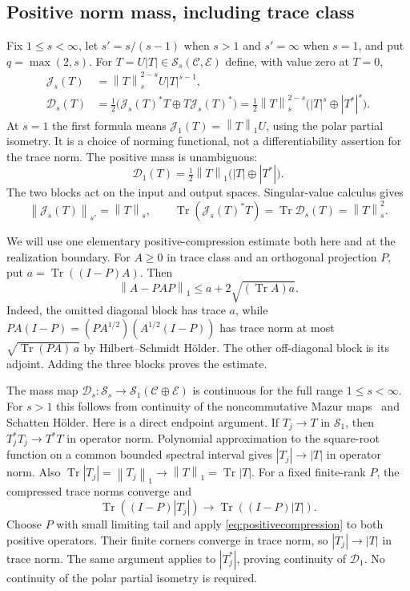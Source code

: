 \documentclass[11pt,a4paper]{amsart}
\numberwithin{equation}{section}
\theoremstyle{definition}
\theoremstyle{remark}
\newcommand{\cC}{\mathcal C}
\newcommand{\cE}{\mathcal E}
\newcommand{\Sch}{\mathcal S}
\DeclareMathOperator{\Tr}{Tr}
\newcommand{\norm}[1]{\left\lVert#1\right\rVert}
\newcommand{\Dens}{\mathscr D_s}
\newcommand{\Jdu}{\mathscr J_s}
\begin{document}
\subsection{Positive norm mass, including trace class}
Fix $1\le s<\infty$, let $s'=s/(s-1)$ when $s>1$ and $s'=\infty$ when $s=1$, and put $q=\max(2,s)$. For $T=U|T|\in\Sch_s(\cC,\cE)$ define, with value zero at $T=0$,
\begin{align}
 \Jdu(T)&=\norm T_s^{2-s}U|T|^{s-1},\label{eq:dualitymap}\\
 \Dens(T)&=\tfrac12\big(\Jdu(T)^*T\oplus T\Jdu(T)^*\big)
 =\tfrac12\norm T_s^{2-s}\big(|T|^s\oplus|T^*|^s\big).\label{eq:positivemass}
\end{align}
At $s=1$ the first formula means $\mathscr J_1(T)=\norm T_1U$, using the polar partial isometry. It is a choice of norming functional, not a differentiability assertion for the trace norm. The positive mass is unambiguous:
\[
 \mathscr D_1(T)=\tfrac12\norm T_1\big(|T|\oplus|T^*|\big).
\]
The two blocks act on the input and output spaces. Singular-value calculus gives
\begin{equation}\label{eq:massidentity}
 \norm{\Jdu(T)}_{s'}=\norm T_s,
 \qquad\Tr(\Jdu(T)^*T)=\Tr\Dens(T)=\norm T_s^2.
\end{equation}

We will use one elementary positive-compression estimate both here and at the realization boundary. For $A\ge0$ in trace class and an orthogonal projection $P$, put $a=\Tr((I-P)A)$. Then
\begin{equation}\label{eq:positivecompression}
 \norm{A-PAP}_1\le a+2\sqrt{(\Tr A)a}.
\end{equation}
Indeed, the omitted diagonal block has trace $a$, while
$PA(I-P)=(PA^{1/2})(A^{1/2}(I-P))$ has trace norm at most
$\sqrt{\Tr(PA)\,a}$ by Hilbert--Schmidt H\"older. The other off-diagonal block is its adjoint. Adding the three blocks proves the estimate.

The mass map $\Dens:\Sch_s\to\Sch_1(\cC\oplus\cE)$ is continuous for the full range $1\le s<\infty$. For $s>1$ this follows from continuity of the noncommutative Mazur maps~\cite{Ricard} and Schatten H\"older. Here is a direct endpoint argument. If $T_j\to T$ in $\Sch_1$, then $T_j^*T_j\to T^*T$ in operator norm. Polynomial approximation to the square-root function on a common bounded spectral interval gives $|T_j|\to|T|$ in operator norm. Also
$\Tr|T_j|=\norm{T_j}_1\to\norm T_1=\Tr|T|$.
For a fixed finite-rank $P$, the compressed trace norms converge and
\[
 \Tr((I-P)|T_j|)\longrightarrow\Tr((I-P)|T|).
\]
Choose $P$ with small limiting tail and apply \eqref{eq:positivecompression} to both positive operators. Their finite corners converge in trace norm, so $|T_j|\to|T|$ in trace norm. The same argument applies to $|T_j^*|$, proving continuity of $\mathscr D_1$. No continuity of the polar partial isometry is required.
\end{document}
